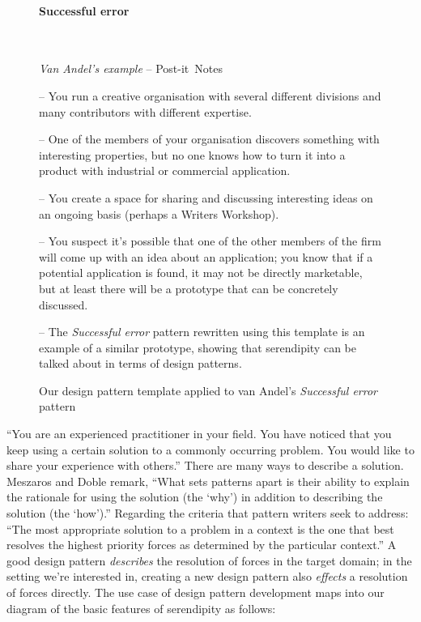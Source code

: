 \begin{figure}[!ht]
\begin{mdframed}
\paragraph{\textbf{Successful error}}~
\baselineskip
\begin{flushright}\emph{Van Andel's example} -- Post-it\texttrademark\ Notes
\end{flushright}
\vspace{-.15cm}
\begin{description}[itemsep=2pt]
\item[{\tt context}] -- You run a creative organisation with several different divisions and many contributors with different expertise.  
\item[{\tt problem}] -- One of the members of your organisation
  discovers something with interesting properties, but no one
  knows how to turn it into a product with industrial or commercial application.
\item[{\tt solution}] -- You create a space for sharing and discussing
  interesting ideas on an ongoing basis (perhaps a Writers Workshop).
\item[{\tt rationale}] -- You suspect it's possible that one of the
  other members of the firm will come up with an idea about an
  application; you know that if a potential application is found, it
  may not be directly marketable, but at least there will be a
  prototype that can be concretely discussed.
\item[{\tt resolution}] -- The \emph{Successful error} pattern
  rewritten using this template is an example of a similar
  prototype, showing that serendipity can be talked about in
  terms of design patterns.
\end{description}
\end{mdframed}
\caption{Our design pattern template applied to van Andel's \emph{Successful error} pattern\label{fig:va-pattern-figure}}
\end{figure}

\noindent ``You are an experienced practitioner in your
field. You have noticed that you keep using a certain solution to a
commonly occurring problem. You would like to share your experience
with others.''  There are many ways to describe a solution.
Meszaros and Doble remark, ``What sets patterns apart is their
ability to explain the rationale for using the solution (the `why') in
addition to describing the solution (the `how').''  Regarding the
criteria that pattern writers seek to address: ``The most appropriate
solution to a problem in a context is the one that best resolves the
highest priority forces as determined by the particular context.'' 
%
%
A good design pattern \emph{describes} the resolution of forces in the
target domain; in the setting we're interested in, creating a new
design pattern also \emph{effects} a resolution of forces directly.
The use case of design pattern development maps into our diagram of
the basic features of serendipity as follows:



